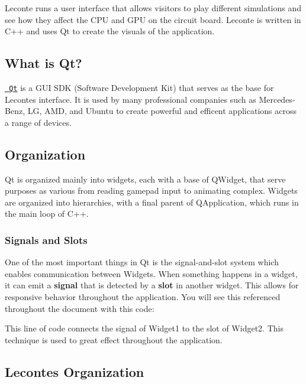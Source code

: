 Leconte runs a user interface that allows visitors to play different simulations and see how they affect the C\+PU and G\+PU on the circuit board. Leconte is written in C++ and uses Qt to create the visuals of the application.

\subsection*{What is Qt?}

\href{https://www.qt.io/}{\texttt{ Qt}} is a G\+UI S\+DK (Software Development Kit) that serves as the base for Leconte\textquotesingle{}s interface. It is used by many professional companies such as Mercedes-\/\+Benz, LG, A\+MD, and Ubuntu to create powerful and efficent applications across a range of devices.

\subsection*{Organization}

Qt is organized mainly into widgets, each with a base of Q\+Widget, that serve purposes as various from reading gamepad input to animating complex. Widgets are organized into hierarchies, with a final parent of Q\+Application, which runs in the main loop of C++.

\subsubsection*{Signals and Slots}

One of the most important things in Qt is the signal-\/and-\/slot system which enables communication between Widgets. When something happens in a widget, it can emit a {\bfseries{signal}} that is detected by a {\bfseries{slot}} in another widget. This allows for responsive behavior throughout the application. You will see this referenced throughout the document with this code\+:


\begin{DoxyCode}{0}
\end{DoxyCode}


This line of code connects the signal of {\ttfamily Widget1} to the slot of {\ttfamily Widget2}. This technique is used to great effect throughout the application.

\subsection*{Leconte\textquotesingle{}s Organization}

